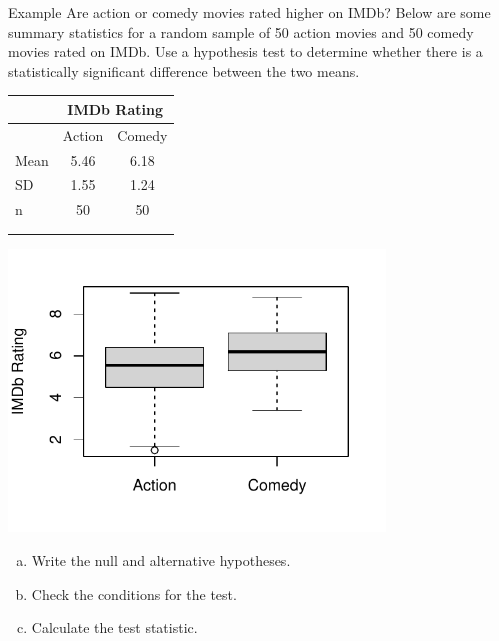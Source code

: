 \documentclass[11pt, fleqn]{beamer}\usepackage[]{graphicx}\usepackage[]{color}
\begin{document}
\begin{frame}{Example}
Are action or comedy movies rated higher on IMDb?  Below are some summary statistics for a random sample of 50 action movies and 50 comedy movies rated on IMDb.  Use a hypothesis test to determine whether there is a statistically significant difference between the two means.\\
\vspace{1cm}

\noindent\begin{minipage}[c]{0.38\textwidth}
\begin{center}
\begin{tabular}{l c c }
\hline
        & \multicolumn{2}{c}{IMDb Rating} \\
\hline
        & Action     & Comedy         \\
Mean    & 5.46       & 6.18     \\
SD      & 1.55       & 1.24       \\
n       & 50         & 50 \\
\hline
& \\
& \\
\end{tabular}
\end{center}
\end{minipage}
\begin{minipage}[c]{0.6\textwidth}
\begin{center}
\includegraphics[width=0.75\textwidth]{movie_boxplot.pdf}
\end{center}
\end{minipage}
\end{frame}

\begin{frame}
\small
\begin{enumerate}[(a)]
\item Write the null and alternative hypotheses.
\vspace{0.75cm}
\item Check the conditions for the test.
\vspace{2cm}
\item Calculate the test statistic.
\vspace{2cm}
\end{enumerate}
\end{frame}
\end{document}
